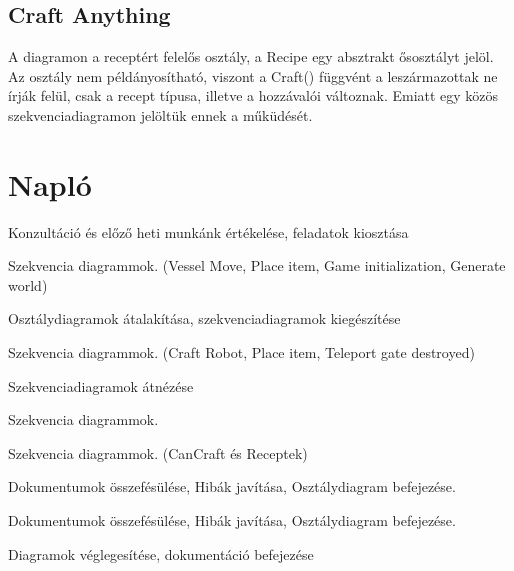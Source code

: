 \documentclass[../../projlab]{subfiles}
\begin{document}
\subsection{Craft Anything}
A diagramon a receptért felelős osztály, a Recipe egy absztrakt ősosztályt jelöl. Az osztály nem példányosítható, viszont a Craft() függvént a leszármazottak ne írják felül, csak a recept típusa, illetve a hozzávalói változnak. Emiatt egy közös szekvenciadiagramon jelöltük ennek a műküdését.


\section{Napló}

\begin{naplo}

	{ 
		Konzultáció és előző heti munkánk értékelése, feladatok kiosztása   
	}

	{ 
		Szekvencia diagrammok. (Vessel Move, Place item, Game initialization, Generate world)
	}

	{ 
		Osztálydiagramok átalakítása, szekvenciadiagramok kiegészítése
	}
	
	{ 
		Szekvencia diagrammok. (Craft Robot, Place item, Teleport gate destroyed)
	}

	{ 
		Szekvenciadiagramok átnézése   
	}

	{ 
		Szekvencia diagrammok.   
	}

	{ 
		Szekvencia diagrammok. (CanCraft és Receptek)
	}

	{ 
		Dokumentumok összefésülése, Hibák javítása, Osztálydiagram befejezése.   
	}

	{ 
		Dokumentumok összefésülése, Hibák javítása, Osztálydiagram befejezése.   
	}

	{ 
		Diagramok véglegesítése, dokumentáció befejezése   
	}

\end{naplo}

\begin{toappendix}



	
\end{toappendix}
\end{document}
